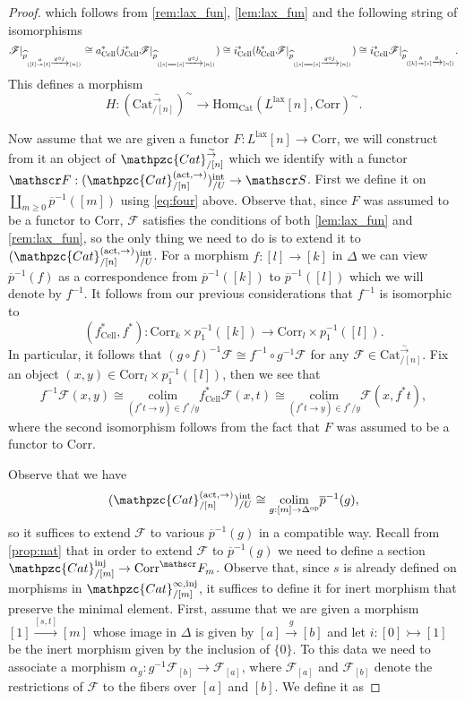 \documentclass[a4paper, reqno]{amsart}
\theoremstyle{definition}
\newcommand\cF{\mathscr F}
\newcommand\cS{\mathscr S}
\newcommand\mor{\mathrm{Hom}}
\newcommand\inj{\mathrm{inj}}
\newcommand\op{\mathrm{op}}
\newcommand\cat{\mathrm{Cat}}
\newcommand\ccat{\mathpzc{Cat}}
\newcommand\colim{\mathrm{colim}}
\newcommand\corr{\mathrm{Corr}}
\newcommand\cell{\mathrm{Cell}}
\newcommand\lax{\mathrm{lax}}
\newcommand\wrr{{\overset{\sim}{\rightarrow}}}
\newcommand\act{\mathrm{act}}
\newcommand\inrt{\mathrm{int}}
\begin{document}
\begin{proof}
which follows from \cref{rem:lax_fun}, \cref{lem:lax_fun} and the following string of isomorphisms
\[\cF|_{\widehat{p}_{([l]\overset{a}{\twoheadrightarrow}[t]\xrightarrow{g\circ j}[n])}}\cong a^*_\cell(j^*_\cell\cF|_{\widehat{p}_{([s]=\joinrel=[s]\xrightarrow{g\circ j}[n])}})\cong i^*_\cell(b^*_\cell\cF|_{\widehat{p}_{([s]=\joinrel=[s]\xrightarrow{g\circ j}[n])}})\cong i^*_\cell\cF|_{\widehat{p}_{([k]\overset{b}{\twoheadrightarrow}[s]\xrightarrow{g}[n])}}.\]
This defines a morphism \[H:(\cat^\wrr_{/[n]})^\sim\rightarrow\mor_\cat(L^\lax[n],\corr)^\sim.\]\par
Now assume that we are given a functor $F:L^\lax[n]\rightarrow\corr$, we will construct from it an object of $\ccat^\wrr_{/[n]}$ which we identify with a functor $\cF:(\ccat^{(\act,\rightarrow)}_{/[n]})^\inrt_{/U}\rightarrow\cS$. First we define it on $\coprod_{m\geq0}\overline{p}^{-1}([m])$ using \cref{eq:four} above. Observe that, since $F$ was assumed to be a functor to $\corr$, $\cF$ satisfies the conditions of both \cref{lem:lax_fun} and \cref{rem:lax_fun}, so the only thing we need to do is to extend it to $(\ccat^{(\act,\rightarrow)}_{/[n]})^\inrt_{/U}$.  For a morphism $f:[l]\rightarrow[k]$ in $\Delta$ we can view $\overline{p}^{-1}(f)$ as a correspondence from $\overline{p}^{-1}([k])$ to $\overline{p}^{-1}([l])$ which we will denote by $f^{-1}$. It follows from our previous considerations that $f^{-1}$ is isomorphic to 
\[(f^*_\cell,f^*):\corr_k\times p_1^{-1}([k])\rightarrow\corr_l\times p_1^{-1}([l]).\]
In particular, it follows that $(g\circ f)^{-1}\cF\cong f^{-1}\circ g^{-1}\cF$ for any $\cF\in\cat^\wrr_{/[n]}$. Fix an object $(x,y)\in\corr_l\times p_1^{-1}([l])$, then we see that
\[f^{-1}\cF(x,y)\cong \underset{(f^*t\rightarrow y)\in f^*/y}{\colim}f^*_\cell\cF(x,t)\cong \underset{(f^*t\rightarrow y)\in f^*/y}{\colim}\cF(x,f^*t),\]
where the second isomorphism follows from the fact that $F$ was assumed to be a functor to $\corr$.\par
Observe that we have
\[(\ccat^{(\act,\rightarrow)}_{/[n]})^\inrt_{/U}\cong\underset{g:[m]\rightarrow\Delta^\op}{\colim}\overline{p}^{-1}(g),\]
so it suffices to extend $\cF$ to various $\overline{p}^{-1}(g)$ in a compatible way. Recall from \cref{prop:nat} that in order to extend $\cF$ to $\overline{p}^{-1}(g)$ we need to define a section $\ccat^\inj_{/[m]}\rightarrow\corr^\cF_m$.  Observe that, since $s$ is already defined on morphisms in $\ccat^{\infty,\inj}_{/[m]}$, it suffices to define it for inert morphism that preserve the minimal element. First, assume that we are given a morphism $[1]\xrightarrow{[s,t]}[m]$ whose image in $\Delta$ is given by $[a]\xrightarrow{g} [b]$ and let $i:[0]\rightarrowtail[1]$ be the inert morphism given by the inclusion of $\{0\}$. To this data we need to associate a morphism $\alpha_g:g^{-1}\cF_{[b]}\rightarrow\cF_{[a]}$, where $\cF_{[a]}$ and $\cF_{[b]}$ denote the restrictions of $\cF$ to the fibers over $[a]$ and $[b]$. We define it as

\end{proof}
\end{document}
